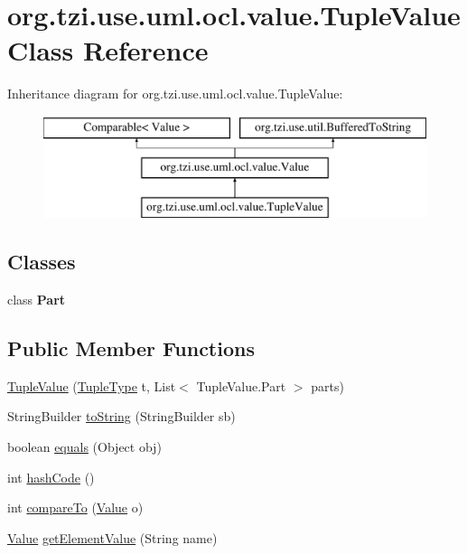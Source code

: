 \hypertarget{classorg_1_1tzi_1_1use_1_1uml_1_1ocl_1_1value_1_1_tuple_value}{\section{org.\-tzi.\-use.\-uml.\-ocl.\-value.\-Tuple\-Value Class Reference}
\label{classorg_1_1tzi_1_1use_1_1uml_1_1ocl_1_1value_1_1_tuple_value}
}
Inheritance diagram for org.\-tzi.\-use.\-uml.\-ocl.\-value.\-Tuple\-Value\-:\begin{figure}[H]
\begin{center}
\leavevmode
\includegraphics[height=3.000000cm]{classorg_1_1tzi_1_1use_1_1uml_1_1ocl_1_1value_1_1_tuple_value}
\end{center}
\end{figure}
\subsection*{Classes}
\begin{DoxyCompactItemize}
\item 
class {\bfseries Part}
\end{DoxyCompactItemize}
\subsection*{Public Member Functions}
\begin{DoxyCompactItemize}
\item 
\hyperlink{classorg_1_1tzi_1_1use_1_1uml_1_1ocl_1_1value_1_1_tuple_value_aaed385d7ff5038ab839aea9495d9a7d3}{Tuple\-Value} (\hyperlink{classorg_1_1tzi_1_1use_1_1uml_1_1ocl_1_1type_1_1_tuple_type}{Tuple\-Type} t, List$<$ Tuple\-Value.\-Part $>$ parts)
\item 
String\-Builder \hyperlink{classorg_1_1tzi_1_1use_1_1uml_1_1ocl_1_1value_1_1_tuple_value_ab905d2e16aa04f6a1e4ea267a3cdf492}{to\-String} (String\-Builder sb)
\item 
boolean \hyperlink{classorg_1_1tzi_1_1use_1_1uml_1_1ocl_1_1value_1_1_tuple_value_a1e05824f9687104aa1fa4e594602c17a}{equals} (Object obj)
\item 
int \hyperlink{classorg_1_1tzi_1_1use_1_1uml_1_1ocl_1_1value_1_1_tuple_value_a06757a753e1471feb0a21dd3a1d69b5a}{hash\-Code} ()
\item 
int \hyperlink{classorg_1_1tzi_1_1use_1_1uml_1_1ocl_1_1value_1_1_tuple_value_a924887e4ee6ca2c07f6b303513816c92}{compare\-To} (\hyperlink{classorg_1_1tzi_1_1use_1_1uml_1_1ocl_1_1value_1_1_value}{Value} o)
\item 
\hyperlink{classorg_1_1tzi_1_1use_1_1uml_1_1ocl_1_1value_1_1_value}{Value} \hyperlink{classorg_1_1tzi_1_1use_1_1uml_1_1ocl_1_1value_1_1_tuple_value_a48e1553065cbb608fda6517f990f5fc8}{get\-Element\-Value} (String name)
\end{DoxyCompactItemize}
